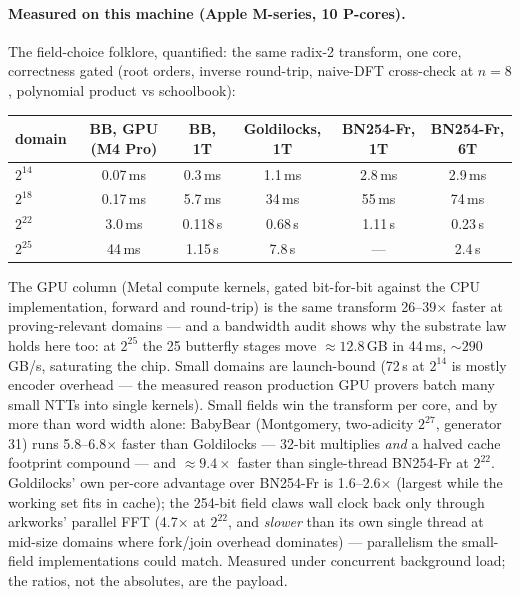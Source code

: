 \documentclass[10pt]{article}
\begin{document}
\paragraph{Measured on this machine (Apple M-series, 10 P-cores).}
The field-choice folklore, quantified: the same radix-2 transform,
one core, correctness gated (root orders, inverse round-trip,
naive-DFT cross-check at $n=8$, polynomial product vs schoolbook):
\begin{center}
\begin{tabular}{lccccc}
domain & BB, GPU (M4 Pro) & BB, 1T & Goldilocks, 1T & BN254-Fr, 1T & BN254-Fr, 6T\\
\hline
$2^{14}$ & 0.07\,ms & 0.3\,ms & 1.1\,ms & 2.8\,ms & 2.9\,ms\\
$2^{18}$ & 0.17\,ms & 5.7\,ms & 34\,ms & 55\,ms & 74\,ms\\
$2^{22}$ & 3.0\,ms & 0.118\,s & 0.68\,s & 1.11\,s & 0.23\,s\\
$2^{25}$ & 44\,ms & 1.15\,s & 7.8\,s & --- & 2.4\,s\\
\end{tabular}
\end{center}
The GPU column (Metal compute kernels, gated bit-for-bit against
the CPU implementation, forward and round-trip) is the same
transform 26--39$\times$ faster at proving-relevant domains ---
and a bandwidth audit shows why the substrate law holds here too:
at $2^{25}$ the 25 butterfly stages move ${\approx}12.8$\,GB in
44\,ms, ${\sim}290$\,GB/s, saturating the chip. Small domains are
launch-bound (72\,\textmu s at $2^{14}$ is mostly encoder
overhead --- the measured reason production GPU provers batch
many small NTTs into single kernels).
Small fields win the transform per core, and by more than word
width alone: BabyBear (Montgomery, two-adicity $2^{27}$, generator
31) runs 5.8--6.8$\times$ faster than Goldilocks --- 32-bit
multiplies \emph{and} a halved cache footprint compound --- and
${\approx}9.4\times$ faster than single-thread BN254-Fr at
$2^{22}$. Goldilocks' own per-core advantage over BN254-Fr is
1.6--2.6$\times$ (largest while the working set fits in cache);
the 254-bit field claws wall clock back only through arkworks'
parallel FFT (4.7$\times$ at $2^{22}$, and \emph{slower} than its
own single thread at mid-size domains where fork/join overhead
dominates) --- parallelism the small-field implementations could
match. Measured under concurrent background load; the ratios, not
the absolutes, are the payload.
\end{document}
